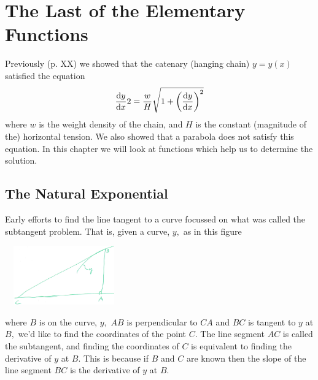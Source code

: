 \chapter{The Last of the Elementary Functions}
\label{cha:last-elem-funct}

\aptta{}
Previously (p. XX)  we showed that the catenary (hanging chain)
$y=y(x)$ satisfied the equation 
$$
\frac{\text{d}{y}}{\text{d}{x}}{2}=\frac{w}{H} \sqrt{1+  \left(\frac{\text{d}{y}}{\text{d}{x}}\right)^2 }
$$
where $w$ is the weight density of the chain, and $H$ is the constant
(magnitude of the) horizontal tension.  We also showed that a parabola
does not satisfy this equation.  In this chapter we will look at
functions which help us to determine the solution.
\endaptta{}

\section{The Natural Exponential}
\label{sec:exponential}

Early efforts to find the line tangent to a curve focussed on what
was  called the subtangent problem. That is, given a curve, $y,$ as in
this figure\\
\centerline{\includegraphics*[height=1in,width=2in]{Figures/subtan1}}
where $B$ is on the curve, $y,$ $AB$ is perpendicular to $CA$ and $BC$
is tangent to $y$ at $B,$ we'd like to find the coordinates of the
point $C.$ The line segment $AC$ is called the subtangent, and finding
the coordinates of $C$ is equivalent to finding the derivative of $y$
at $B.$  This is because if $B$ and $C$ are known then the slope of
the line segment $BC$ is the derivative of $y$ at $B.$

